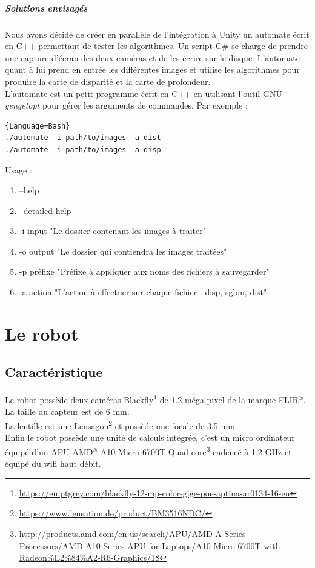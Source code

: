 \documentclass[12pt,a4paper]{report}
\begin{document}
\paragraph{Solutions envisagés}
Nous avons décidé de créer en parallèle de l'intégration à Unity un automate écrit en C++ permettant de tester les algorithmes. Un script C\# se charge de prendre une capture d'écran des deux caméras et de les écrire sur le disque. L'automate quant à lui prend en entrée les différentes images et utilise les algorithmes pour produire la carte de disparité et la carte de profondeur.\\
L'automate est un petit programme écrit en C++ en utilisant l'outil GNU \textit{gengetopt} pour gérer les arguments de commandes. Par exemple :\\

\begin{lstlisting}{Language=Bash}
./automate -i path/to/images -a dist
./automate -i path/to/images -a disp
\end{lstlisting}

Usage :
\begin{enumerate}
\item[] --help
\item[] --detailed-help
\item[] -i input "Le dossier contenant les images à traiter"
\item[] -o output "Le dossier qui contiendra les images traitées"
\item[] -p préfixe "Préfixe à appliquer aux noms des fichiers à sauvegarder"
\item[] -a action "L'action à effectuer sur chaque fichier : disp, sgbm, dist"
\end{enumerate}

\chapter{Le robot}

\section{Caractéristique}
Le robot possède deux caméras Blackfly\footnote{\url{https://eu.ptgrey.com/blackfly-12-mp-color-gige-poe-aptina-ar0134-16-eu}} de 1.2 méga-pixel de la marque FLIR$^{\text{®}}$. La taille du capteur est de 6 mm.\\
La lentille est une Lensagon\footnote{\url{https://www.lensation.de/product/BM3516NDC/}} et possède une focale de 3.5 mm. 
\\Enfin le robot possède une unité de calculs intégrée, c'est un micro ordinateur équipé d'un APU AMD$^{\text{®}}$ A10 Micro-6700T Quad core\footnote{\url{http://products.amd.com/en-us/search/APU/AMD-A-Series-Processors/AMD-A10-Series-APU-for-Laptops/A10-Micro-6700T-with-Radeon\%E2\%84\%A2-R6-Graphics/18}}  cadencé à 1.2 GHz et équipé du wifi haut débit.
\end{document}
